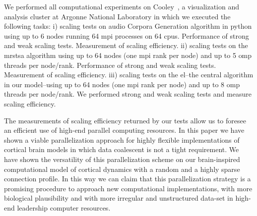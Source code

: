 {We performed all computational experiments on Cooley~\cite{noauthor_cooley_nodate}, a visualization and analysis cluster at Argonne National Laboratory in which we executed the following tasks: i) scaling tests on audio Corpora Generation algorithm in python using up to 6 nodes running 64 \gls{mpi} processes on 64 \glspl{cpu}. Performance of strong and weak scaling tests. Measurement of scaling efficiency. ii) scaling tests on the \gls{mrstsa} algorithm using up to 64 nodes (one \gls{mpi} rank per node) and up to 5 \gls{omp} threads per node/rank. Performance of strong and weak scaling tests. Measurement of scaling efficiency. iii) scaling tests on the \gls{el}--the central algorithm in our model--using up to 64 nodes (one \gls{mpi} rank per node) and up to 8 \gls{omp} threads per node/rank. We performed strong and weak scaling tests and measure scaling efficiency. 

The measurements of scaling efficiency returned by our tests allow us to foresee an efficient use of high-end parallel computing resources. In this paper we have shown a viable parallelization approach for highly flexible implementations of cortical brain models in which data coalescent is not a tight requirement. We have shown the versatility of this parallelization scheme on our brain-inspired computational model of cortical dynamics with a random and a highly sparse connection profile. In this way we can claim that this parallelization strategy is a promising procedure to approach new computational implementations, with more biological plausibility and with more irregular and unstructured data-set in high-end leadership computer resources.
}



















